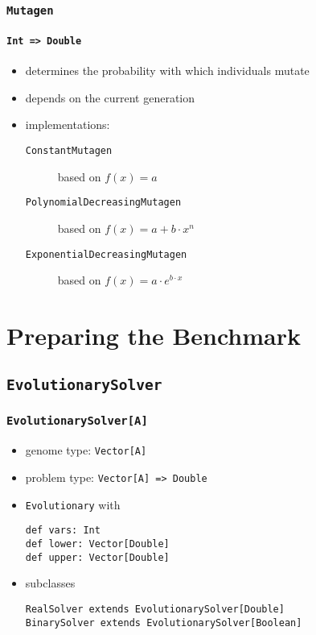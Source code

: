\documentclass[compress,xcolor=table]{beamer}
\begin{document}
\begin{frame}
  \frametitle{\texttt{Mutagen}}
  \framesubtitle{\texttt{Int => Double}}
  \begin{itemize}
    \item determines the probability with which individuals mutate
    \item depends on the current generation
    \item implementations:
    \begin{description}
      \item[\texttt{ConstantMutagen}] $~$ \\ based on $f(x) = a$
      \item[\texttt{PolynomialDecreasingMutagen}] $~$ \\ based on $f(x) = a + b \cdot x^n$
      \item[\texttt{ExponentialDecreasingMutagen}] $~$ \\ based on $f(x) = a \cdot e^{b \cdot x}$
    \end{description}
  \end{itemize}
\end{frame}


\section{Preparing the Benchmark}

\subsection{\texttt{EvolutionarySolver}}

\begin{frame}
  \frametitle{\texttt{EvolutionarySolver[A]}}
  \begin{itemize}
    \item genome type: \texttt{Vector[A]}
    \item problem type: \texttt{Vector[A] => Double}
    \item \texttt{Evolutionary} with
    \begin{description}
      \item[\texttt{def vars: Int}]
      \item[\texttt{def lower: Vector[Double]}]
      \item[\texttt{def upper: Vector[Double]}]
    \end{description}
    \item subclasses
    \begin{description}
      \item[\texttt{RealSolver extends EvolutionarySolver[Double]}]
      \item[\texttt{BinarySolver extends EvolutionarySolver[Boolean]}]
    \end{description}
  \end{itemize}
\end{frame}
\end{document}

